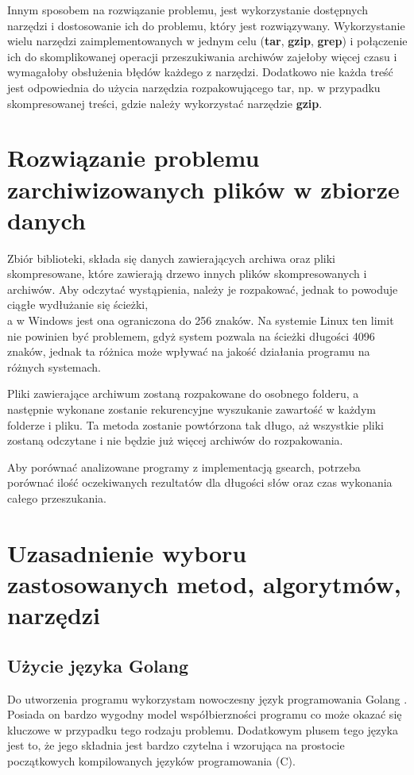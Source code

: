 Innym sposobem na rozwiązanie problemu, jest wykorzystanie dostępnych narzędzi i
dostosowanie ich do problemu, który jest rozwiązywany. Wykorzystanie wielu narzędzi
zaimplementowanych w jednym celu (\textbf{tar}, \textbf{gzip}, \textbf{grep}) i połączenie ich do 
skomplikowanej operacji przeszukiwania archiwów zajełoby więcej czasu
i wymagałoby obsłużenia błędów każdego z narzędzi. Dodatkowo nie każda treść
jest odpowiednia do użycia narzędzia rozpakowującego tar, np. w przypadku 
skompresowanej treści, gdzie należy wykorzystać narzędzie \textbf{gzip}.

\section{Rozwiązanie problemu zarchiwizowanych plików w zbiorze danych}

Zbiór biblioteki, składa się danych zawierających archiwa oraz pliki skompresowane,
które zawierają drzewo innych plików skompresowanych i archiwów.
Aby odczytać wystąpienia, należy je rozpakować, jednak to powoduje ciągłe 
wydłużanie się ścieżki, \\ a w Windows jest ona ograniczona do 256 znaków. Na 
systemie Linux ten limit nie powinien być problemem, gdyż system pozwala na 
ścieżki długości 4096 znaków, jednak ta różnica może wpływać na jakość działania
programu na różnych systemach.

Pliki zawierające archiwum zostaną rozpakowane do osobnego folderu, a następnie
wykonane zostanie rekurencyjne wyszukanie zawartość w każdym folderze i pliku.
Ta metoda zostanie powtórzona tak długo, aż wszystkie pliki zostaną odczytane 
i nie będzie już więcej archiwów do rozpakowania.

Aby porównać analizowane programy z implementacją gsearch, potrzeba porównać
ilość oczekiwanych rezultatów dla długości słów oraz czas wykonania całego 
przeszukania.

\section{Uzasadnienie wyboru zastosowanych metod, algorytmów, narzędzi}

\subsection{Użycie języka Golang}

Do utworzenia programu wykorzystam nowoczesny język programowania Golang \cite{bib:internet:golang}.
Posiada on bardzo wygodny model współbierzności programu co może okazać się 
kluczowe w przypadku tego rodzaju problemu. Dodatkowym plusem tego języka jest
to, że jego składnia jest bardzo czytelna i wzorująca na prostocie początkowych
kompilowanych języków programowania (C).

